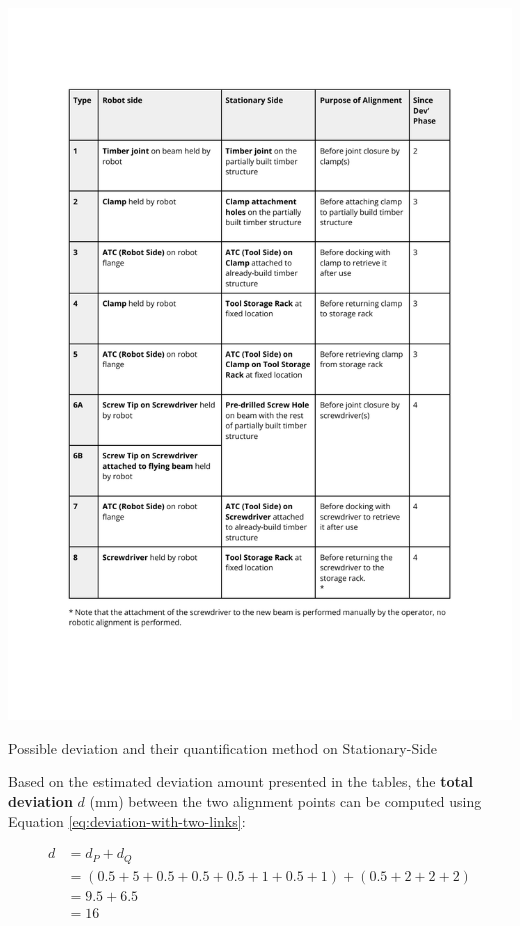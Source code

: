 \begin{table}[ht]
    \includegraphics[page=4, trim=25.4mm 165mm 25.4mm 33mm, clip, width=\textwidth]{tables/Tables in Chapter 9 to 11.pdf}
    \caption{Possible deviation and their quantification method on Stationary-Side}
    \label{table:deviation-stationary-side}
\end{table}

\FloatBarrier

Based on the estimated deviation amount presented in the tables, the \textbf{total deviation} $d$ (mm) between the two alignment points can be computed using Equation \ref{eq:deviation-with-two-links}:

\begingroup\abovedisplayskip=-5pt \belowdisplayskip=10pt
\begin{align}
    d &= d_P + d_Q \nonumber\\
      &= (0.5 + 5 + 0.5 + 0.5 + 0.5 + 1 + 0.5 + 1) + (0.5 + 2 + 2 + 2)\nonumber\\
      &= 9.5 + 6.5\nonumber\\
      &= 16\nonumber
\end{align}
\endgroup

